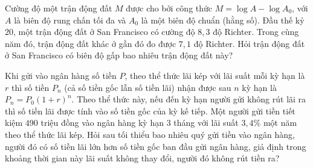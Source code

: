 \begin{bt}%
	Cường độ một trận động đất $M$ được cho bởi công thức $M=\log A-\log A_0$, với $A$ là biên độ rung chấn tối đa và $A_0$ là một biên độ  chuẩn (hằng số). Đầu thế kỷ $20$, một trận động đất ở San Francisco có cường độ $8,3$ độ Richter. Trong cùng năm đó, trận động đất khác ở gần đó đo được $7{,}1$ độ Richter. Hỏi trận động đất ở San Francisco có biên độ gấp bao nhiêu trận động đất này?
\end{bt}

\begin{bt}%
	Khi gửi vào ngân hàng số tiền $P$, theo thể thức lãi kép với lãi suất mỗi kỳ hạn là $r$ thì số tiền $P_n$ (cả số tiền  gốc lẫn số tiền lãi) nhận được sau $n$ kỳ hạn là $P_n=P_0(1+r)^n$. Theo thể thức này, nếu đến kỳ hạn người gửi không rút lãi ra thì số tiền lãi được tính vào số tiền gốc của kỳ kế tiếp. Một người gửi tiền tiết kiệm $490$ triệu đồng vào ngân hàng kỳ hạn $3$ tháng với lãi suất $3,4\%$ một năm theo thể thức lãi kép. Hỏi sau tối thiểu bao nhiêu quý gửi tiền vào ngân hàng, người đó có số tiền lãi lớn hơn số tiền gốc ban đầu gửi ngân hàng, giả định trong khoảng thời gian này lãi suất không thay đổi, người đó không rút tiền ra?
\end{bt}

